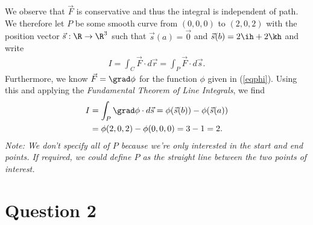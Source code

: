 \documentclass{article}
\begin{document}
We observe that $\vec F$ is conservative and thus the integral is independent of
path. We therefore let $P$ be some smooth curve from $(0,0,0)$ to $(2,0,2)$ with the
position vector $\vec s:\R\to\R^3$ such that $\vec s(a)=\vec 0$ and $\vec s(b)=2\ih + 2\kh$
and write
\begin{align*}
  I=\int_C \vec F \cdot d\vec r = \int_P \vec F \cdot d\vec s.
\end{align*}
Furthermore, we know $\vec F=\grad\phi$ for the function $\phi$ given in (\ref{eqphi}).
Using this and applying the \emph{Fundamental Theorem of Line Integrals}, we find
\begin{align*}
  I &= \int_P \grad \phi\cdot d\vec s = \phi(\vec s(b))-\phi(\vec s(a)) \\
  &= \phi(2,0,2)-\phi(0,0,0) = 3 - 1 = 2.
\end{align*}
\emph{Note: We don't specify all of $P$ because we're only interested in the start
and end points. If required, we could define $P$ as the straight line between
the two points of interest.}


\section*{Question 2}
\end{document}
